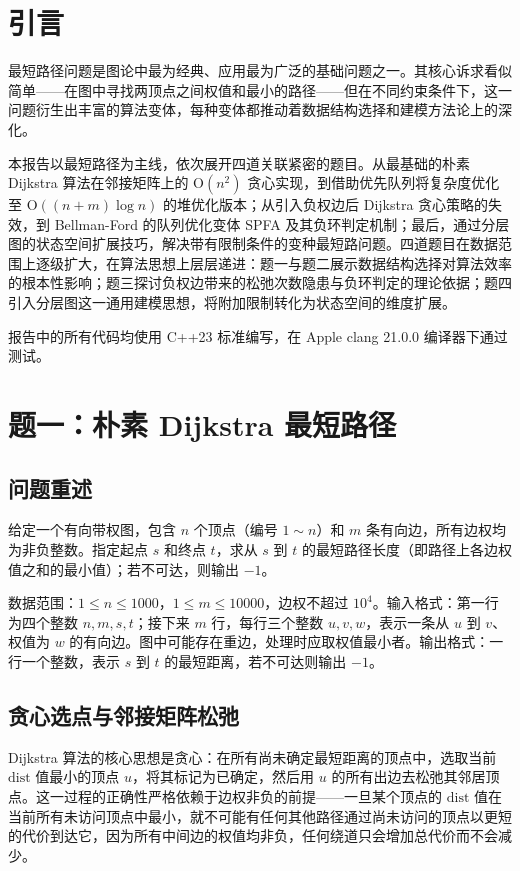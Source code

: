 \documentclass[12pt, a4paper]{academics}
\begin{document}
\makeacademicscover

\section{引言}

最短路径问题是图论中最为经典、应用最为广泛的基础问题之一。其核心诉求看似简单——在图中寻找两顶点之间权值和最小的路径——但在不同约束条件下，这一问题衍生出丰富的算法变体，每种变体都推动着数据结构选择和建模方法论上的深化。

本报告以最短路径为主线，依次展开四道关联紧密的题目。从最基础的朴素 Dijkstra 算法在邻接矩阵上的 $\mathrm{O}(n^2)$ 贪心实现，到借助优先队列将复杂度优化至 $\mathrm{O}((n+m) \log n)$ 的堆优化版本；从引入负权边后 Dijkstra 贪心策略的失效，到 Bellman-Ford 的队列优化变体 SPFA 及其负环判定机制；最后，通过分层图的状态空间扩展技巧，解决带有限制条件的变种最短路问题。四道题目在数据范围上逐级扩大，在算法思想上层层递进：题一与题二展示数据结构选择对算法效率的根本性影响；题三探讨负权边带来的松弛次数隐患与负环判定的理论依据；题四引入分层图这一通用建模思想，将附加限制转化为状态空间的维度扩展。

报告中的所有代码均使用 C++23 标准编写，在 Apple clang 21.0.0 编译器下通过测试。

\section{题一：朴素 Dijkstra 最短路径}

\subsection{问题重述}

给定一个有向带权图，包含 $n$ 个顶点（编号 $1 \sim n$）和 $m$ 条有向边，所有边权均为非负整数。指定起点 $s$ 和终点 $t$，求从 $s$ 到 $t$ 的最短路径长度（即路径上各边权值之和的最小值）；若不可达，则输出 $-1$。

数据范围：$1 \le n \le 1000$，$1 \le m \le 10000$，边权不超过 $10^4$。输入格式：第一行为四个整数 $n, m, s, t$；接下来 $m$ 行，每行三个整数 $u, v, w$，表示一条从 $u$ 到 $v$、权值为 $w$ 的有向边。图中可能存在重边，处理时应取权值最小者。输出格式：一行一个整数，表示 $s$ 到 $t$ 的最短距离，若不可达则输出 $-1$。

\subsection{贪心选点与邻接矩阵松弛}

Dijkstra 算法的核心思想是贪心：在所有尚未确定最短距离的顶点中，选取当前 $\mathrm{dist}$ 值最小的顶点 $u$，将其标记为已确定，然后用 $u$ 的所有出边去松弛其邻居顶点。这一过程的正确性严格依赖于边权非负的前提——一旦某个顶点的 $\mathrm{dist}$ 值在当前所有未访问顶点中最小，就不可能有任何其他路径通过尚未访问的顶点以更短的代价到达它，因为所有中间边的权值均非负，任何绕道只会增加总代价而不会减少。
\end{document}
